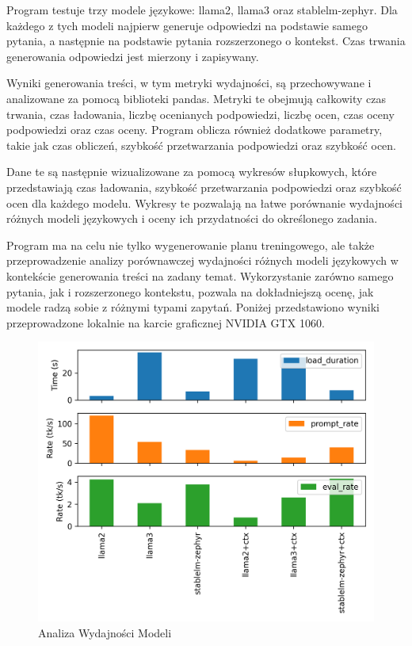 Program testuje trzy modele językowe: llama2, llama3 oraz stablelm-zephyr. Dla każdego z tych modeli najpierw generuje odpowiedzi na podstawie samego pytania, a następnie na podstawie pytania rozszerzonego o kontekst. Czas trwania generowania odpowiedzi jest mierzony i zapisywany.

Wyniki generowania treści, w tym metryki wydajności, są przechowywane i analizowane za pomocą biblioteki pandas. Metryki te obejmują całkowity czas trwania, czas ładowania, liczbę ocenianych podpowiedzi, liczbę ocen, czas oceny podpowiedzi oraz czas oceny. Program oblicza również dodatkowe parametry, takie jak czas obliczeń, szybkość przetwarzania podpowiedzi oraz szybkość ocen.

Dane te są następnie wizualizowane za pomocą wykresów słupkowych, które przedstawiają czas ładowania, szybkość przetwarzania podpowiedzi oraz szybkość ocen dla każdego modelu. Wykresy te pozwalają na łatwe porównanie wydajności różnych modeli językowych i oceny ich przydatności do określonego zadania.

Program ma na celu nie tylko wygenerowanie planu treningowego, ale także przeprowadzenie analizy porównawczej wydajności różnych modeli językowych w kontekście generowania treści na zadany temat. Wykorzystanie zarówno samego pytania, jak i rozszerzonego kontekstu, pozwala na dokładniejszą ocenę, jak modele radzą sobie z różnymi typami zapytań. Poniżej przedstawiono wyniki przeprowadzone lokalnie na karcie graficznej NVIDIA GTX 1060.

\begin{figure}[H]
    \centering
    \includegraphics[width=1\textwidth]{Obrazy/results.png}
    \caption{Analiza Wydajności Modeli}
    \label{fig:my_label}
\end{figure}

